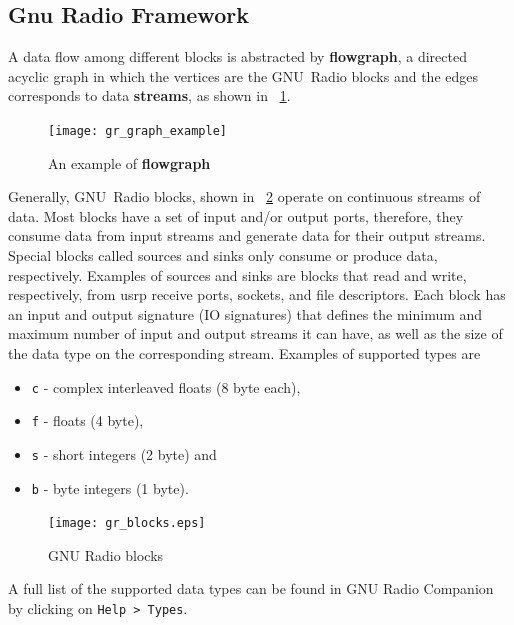 \subsection{Gnu Radio Framework}
A data flow among different blocks is abstracted by \textbf{flowgraph}, a directed acyclic graph in which the vertices are the GNU~Radio blocks and the edges corresponds to data \textbf{streams}, as shown in ~\cref{flowgraph}. 
%
\begin{figure}[thb]
\centering
\texttt{[image: gr\_graph\_example]}
\caption{An example of \textbf{flowgraph}}\label{flowgraph}
\end{figure}
%
Generally, GNU~Radio blocks, shown in ~\cref{fig:gnuradio_block} operate on continuous streams of data. Most blocks have a set of input and/or output ports, therefore, they consume data from input streams and generate data for their output streams. Special blocks called sources and sinks only consume or produce data, respectively. Examples of sources and sinks are blocks that read and write, respectively, from \gls{usrp} receive ports, sockets, and file descriptors. Each block has an input and output signature (IO signatures) that defines the minimum and maximum number of input and output streams it can have, as well as the size of the data type on the corresponding stream. Examples of supported types are
\begin{itemize}
 \item \texttt{c} - complex interleaved floats (8 byte each),
\item \texttt{f} - floats (4 byte),
\item \texttt{s} - short integers (2 byte) and
\item \texttt{b} - byte integers (1 byte).
\end{itemize}
%
\begin{figure}[thb]
\centering
\texttt{[image: gr\_blocks.eps]}
\caption{GNU Radio blocks}\label{fig:gnuradio_block}
\end{figure}

A full list of the supported data types can be found in GNU Radio Companion by clicking on \texttt{Help~>~Types}.
%

